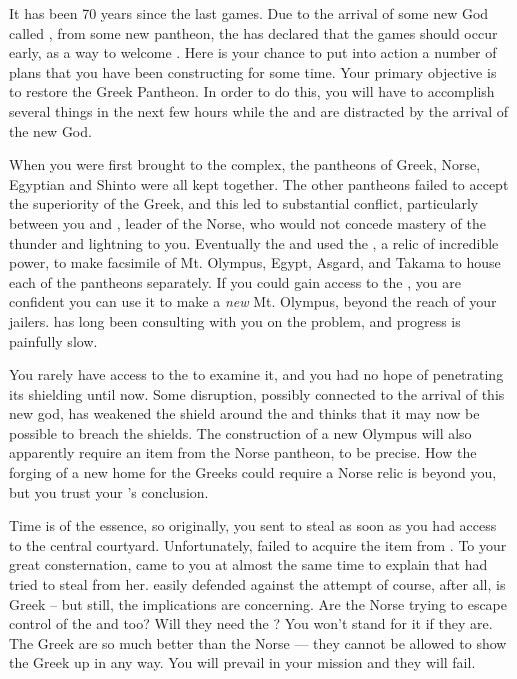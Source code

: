 \documentclass[char]{guardians}
\begin{document}
It has been 70 years since the last games.  Due to the arrival of some new God called \cUnity{}, from some new pantheon, the \cCaretaker{} has declared that the games should occur early, as a way to welcome \cUnity{\them}. Here is your chance to put into action a number of plans that you have been constructing for some time. Your primary objective is to restore the Greek Pantheon. In order to do this, you will have to accomplish several things in the next few hours while the \cCaretaker{} and \cWarden{} are distracted by the arrival of the new God.

When you were first brought to the complex, the pantheons of Greek, Norse, Egyptian and Shinto were all kept together. The other pantheons failed to accept the superiority of the Greek, and this led to substantial conflict, particularly between you and \cOdin{}, leader of the Norse, who would not concede mastery of the thunder and lightning to you. Eventually the \cCaretaker{} and \cWarden{} used the \stone, a relic of incredible power, to make facsimile of Mt. Olympus, Egypt, Asgard, and Takama to house each of the pantheons separately. If you could gain access to the \stone, you are confident you can use it to make a \emph{new} Mt. Olympus, beyond the reach of your jailers. \cHephaestus{} has long been consulting with you on the problem, and progress is painfully slow. 

You rarely have access to the \stone{} to examine it, and you had no hope of penetrating its shielding until now. Some disruption, possibly connected to the arrival of this new god, has weakened the shield around the \stone{} and \cHephaestus{} thinks that it may now be possible to breach the shields. The construction of a new Olympus will also apparently require an item from the Norse pantheon, \iHammer{\MYname} to be precise. How the forging of a new home for the Greeks could require a Norse relic is beyond you, but you trust your \cHephaestus{\offspring}'s conclusion.

Time is of the essence, so originally, you sent \cPandora{} to steal \iHammer{\MYname} as soon as you had access to the central courtyard. Unfortunately, \cPandora{\they} failed to acquire the item from \cHel{}. To your great consternation, \cHera{} came to you at almost the same time to explain that \cVal{} had tried to steal \iSandals{\MYname} from her. \cHera{} easily defended against the attempt of course, after all, \cHera{\they} is Greek -- but still, the implications are concerning. Are the Norse trying to escape control of the \cCaretaker{} and \cWarden{} too? Will they need the \stone? You won't stand for it if they are. The Greek are so much better than the Norse --- they cannot be allowed to show the Greek up in any way. You will prevail in your mission and they will fail.
\end{document}
